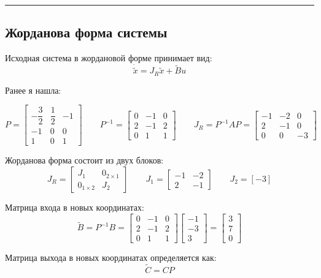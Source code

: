 \documentclass[a4paper,12pt]{article}
\begin{document}
	\hrule
	
\newpage
\subsection{Жорданова форма системы}

Исходная система в жордановой форме принимает вид:
\[
\dot{\tilde{x}} = J_R \tilde{x} + \tilde{B}u
\]

Ранее я нашла:

\[
P =
\begin{bmatrix}
	-\dfrac{3}{2} & \dfrac{1}{2} & -1 \\
	-1 & 0 & 0 \\
	1 & 0 & 1
\end{bmatrix}
\qquad
P^{-1} =
\begin{bmatrix}
	0 & -1 & 0 \\
	2 & -1 & 2 \\
	0 & 1 & 1
\end{bmatrix}
\qquad
J_R = P^{-1}AP =
\begin{bmatrix}
	-1 & -2 & 0 \\
	2 & -1 & 0 \\
	0 & 0 & -3
\end{bmatrix}
\]

Жорданова форма состоит из двух блоков:
\[
J_R =
\begin{bmatrix}
	J_1 & 0_{2\times1} \\
	0_{1\times2} & J_2
\end{bmatrix}
\qquad
J_1 =
\begin{bmatrix}
	-1 & -2 \\
	2 & -1
\end{bmatrix}
\qquad
J_2 = [-3]
\]

Матрица входа в новых координатах:
\[
\tilde{B} = P^{-1}B =
\begin{bmatrix}
	0 & -1 & 0 \\
	2 & -1 & 2 \\
	0 & 1 & 1
\end{bmatrix}
\begin{bmatrix}
	-1 \\ -3 \\ 3
\end{bmatrix}
=
\begin{bmatrix}
	3 \\
	7 \\
	0
\end{bmatrix}
\]


Матрица выхода в новых координатах определяется как:
\[
\tilde{C} = CP
\]
\end{document}
